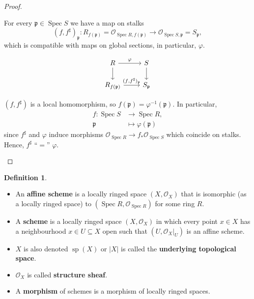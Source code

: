 \documentclass[12pt]{article}
\DeclareMathOperator{\Spec}{Spec}
\DeclareMathOperator{\spa}{sp}
\theoremstyle{definition}
\newtheorem*{definition}{Definition}
\begin{document}
\begin{proof}
\begin{enumerate}
For every $\mathfrak{p}\in\Spec S$ we have a map on stalks
\[(f,f^{\sharp})_{\mathfrak{p}}:R_{f(\mathfrak{p})}=\mathcal{O}_{\Spec R,f(\mathfrak{p})}\longrightarrow\mathcal{O}_{\Spec S,\mathfrak{p}}=S_{\mathfrak{p}},\]
which is compatible with maps on global sections, in particular, $\varphi$.

\[
\begin{tikzcd}
R\arrow[r,"\varphi"]\arrow[d]&S\arrow[d]\\
R_{f(\mathfrak{p})}\arrow[r,"(f{,}f^{\sharp})_{\mathfrak{p}}"]&S_{\mathfrak{p}}
\end{tikzcd}
\]

$(f,f^{\sharp})$ is a local homomorphism, so $f(\mathfrak{p})=\varphi^{-1}(\mathfrak{p})$. In particular,
\begin{align*}
f:\Spec S&\longrightarrow\Spec R,\\
\mathfrak{p}&\longmapsto\varphi(\mathfrak{p})
\end{align*}
since $f^{\sharp}$ and $\varphi$ induce morphisms $\mathcal{O}_{\Spec R}\rightarrow f_*\mathcal{O}_{\Spec S}$ which coincide on stalks. Hence, $f^{\sharp}$ ``$=$'' $\varphi$.
\end{enumerate}
\end{proof}

\begin{definition}
\begin{itemize}
\item An \textbf{affine scheme} is a locally ringed space $(X,\mathcal{O}_X)$ that is isomorphic (as a locally ringed space) to $(\Spec R,\mathcal{O}_{\Spec R})$ for some ring $R$.

\item A \textbf{scheme} is a locally ringed space $(X,\mathcal{O}_X)$ in which every point $x\in X$ has a neighbourhood $x\in U\subseteq X$ open such that $(U,\mathcal{O}_X|_U)$ is an affine scheme.

\item $X$ is also denoted $\spa(X)$ or $|X|$ is called the \textbf{underlying topological space}.

\item $\mathcal{O}_X$ is called \textbf{structure sheaf}.

\item A \textbf{morphism} of schemes is a morphism of locally ringed spaces.
\end{itemize}
\end{definition}
\end{document}

